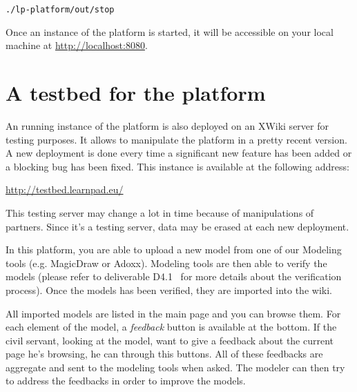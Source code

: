\documentclass{learnpad}
\begin{document}
\begin{lstlisting}[style=javaCode, breaklines]
./lp-platform/out/stop
\end{lstlisting}

Once an instance of the \learnpad platform is started, it will be accessible on 
your local machine at \url{http://localhost:8080}.


\section{A testbed for the \learnpad platform}
\label{sec:testbed}

An running instance of the \learnpad platform is also deployed on an XWiki 
server for testing purposes.  It allows to manipulate the platform in a pretty 
recent version.  A new deployment is done every time a significant new feature 
has been added or a blocking bug has been fixed. This instance is available 
at the following address:

\url{http://testbed.learnpad.eu/}

This testing server may change a lot in time because of manipulations of
partners.  Since it's a testing server, data may be erased at each new
deployment.

In this platform, you are able to upload a new model from one of our Modeling
tools (e.g. MagicDraw or Adoxx).  Modeling tools are then able to verify the 
models (please refer to deliverable D4.1~\cite{learnpad:D4.1} for more details 
about the verification process). Once the models has been verified, they are 
imported into the wiki.

All imported models are listed in the main page and you can browse them.  For
each element of the model, a \textit{feedback} button is available at the 
bottom. If the civil servant, looking at the model, want to give a feedback 
about the current page he's browsing, he can through this buttons.  All of 
these feedbacks are aggregate and sent to the modeling tools when asked.  The 
modeler can then try to address the feedbacks in order to improve the models.







 

\end{document}
